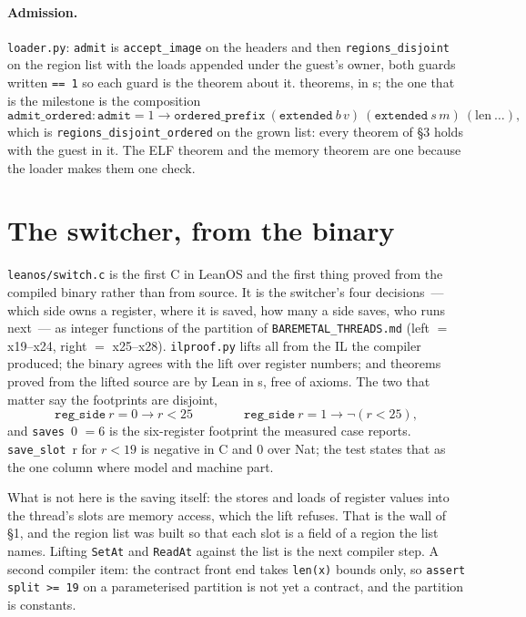\documentclass[11pt]{article}
\begin{document}
\paragraph{Admission.}  \texttt{loader.py}: \texttt{admit} is
\texttt{accept\_image} on the headers and then \texttt{regions\_disjoint} on
the region list with the loads appended under the guest's owner, both guards
written \texttt{== 1} so each guard is the theorem about it.
\ldrTheorems{} theorems, \ldrLeanVerdict{} in \ldrLeanSeconds{}s;
the one that is the milestone is the composition
\[
\texttt{admit\_ordered} : \texttt{admit} = 1 \to \texttt{ordered\_prefix}\ (\texttt{extended}\ b\,v)\ (\texttt{extended}\ s\,m)\ (\mathrm{len}\ \ldots),
\]
which is \texttt{regions\_disjoint\_ordered} on the grown list: every
theorem of \S3 holds with the guest in it.  The ELF theorem and the memory
theorem are one because the loader makes them one check.

\section{The switcher, from the binary}

\texttt{leanos/switch.c} is the first C in LeanOS and the first thing
proved from the compiled binary rather than from source.  It is the
switcher's four decisions~--- which side owns a register, where it is
saved, how many a side saves, who runs next~--- as integer functions of
the partition of \texttt{BAREMETAL\_THREADS.md} (left $=$ x19--x24, right
$=$ x25--x28).  \texttt{ilproof.py} lifts all \swFunctions{} from the IL the
compiler produced; the binary agrees with the lift over \swRegs{} register
numbers; and \swTheorems{} theorems proved from the lifted source are
\swLeanVerdict{} by Lean in \swLeanSeconds{}s, \swLeanNoAxioms{} free of
axioms.  The two that matter say the footprints are disjoint,
\[
\texttt{reg\_side}\ r = 0 \to r < 25 \qquad\qquad \texttt{reg\_side}\ r = 1 \to \neg(r<25),
\]
and \texttt{saves}\ 0 $= 6$ is the six-register footprint the measured
case reports.  \texttt{save\_slot}\ r for $r<19$ is negative in C and 0
over Nat; the test states that as the one column where model and machine
part.

What is not here is the saving itself: the stores and loads of register
values into the thread's slots are memory access, which the lift refuses.
That is the wall of \S1, and the region list was built so that each slot
is a field of a region the list names.  Lifting \texttt{SetAt} and
\texttt{ReadAt} against the list is the next compiler step.  A second
compiler item: the contract front end takes \texttt{len(x)} bounds only,
so \texttt{assert split >= 19} on a parameterised partition is not yet a
contract, and the partition is constants.
\end{document}

